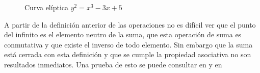 \begin{figure}[H]
  \qquad
	\caption{Curva elíptica $y^2 = x^3 -3x + 5$}%
	\label{fig:test}%
\end{figure}


A partir de la definición anterior de las operaciones no es difícil ver que el punto del infinito es el elemento neutro de la suma, que esta operación de suma es conmutativa y que existe el inverso de todo elemento. Sin embargo que la suma está cerrada con esta definición y que se cumple la propiedad asociativa no son resultados inmediatos. Una prueba de esto se puede consultar en \citep{group_law} y en \citep{group_law_verrill} 

